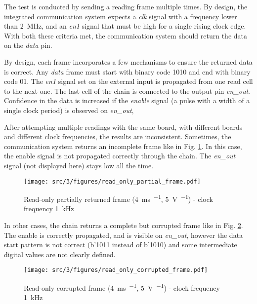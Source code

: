 The test is conducted by sending a reading frame multiple times.
By design, the integrated communication system expects a \textit{clk} signal with a frequency lower than \SI{2}{\mega\hertz}, and an \textit{en1} signal that must be high for a single rising clock edge.
With both these criteria met, the communication system should return the data on the \textit{data} pin.

By design, each frame incorporates a few mechanisms to ensure the returned data is correct.
Any \textit{data} frame must start with binary code 1010 and end with binary code 01.
The \textit{en1} signal set on the external input is propagated from one read cell to the next one.
The last cell of the chain is connected to the output pin \textit{en\_out}.
Confidence in the data is increased if the \textit{enable} signal (a pulse with a width of a single clock period) is observed on \textit{en\_out},

After attempting multiple readings with the same board, with different boards and different clock frequencies, the results are inconsistent.
Sometimes, the communication system returns an incomplete frame like in Fig. \ref{fig:read-only-partial-frame}.
In this case, the enable signal is not propagated correctly through the chain.
The \textit{en\_out} signal (not displayed here) stays low all the time.

\begin{figure}[!h]
  \centering
  \texttt{[image: src/3/figures/read\_only\_partial\_frame.pdf]}
  \caption{Read-only partially returned frame (\SI[per-mode=symbol]{4}{\milli\second\per\div}, \SI[per-mode=symbol]{5}{\volt\per\div}) - clock frequency \SI{1}{\kilo\hertz}}
  \label{fig:read-only-partial-frame}
\end{figure}

In other cases, the chain returns a complete but corrupted frame like in Fig. \ref{fig:read-only-full-frame}.
The enable is correctly propagated, and is visible on \textit{en\_out}, however the data start pattern is not correct (b'1011 instead of b'1010) and some intermediate digital values are not clearly defined.

\begin{figure}[!h]
  \centering
  \texttt{[image: src/3/figures/read\_only\_corrupted\_frame.pdf]}
  \caption{Read-only corrupted frame (\SI[per-mode=symbol]{4}{\milli\second\per\div}, \SI[per-mode=symbol]{5}{\volt\per\div}) - clock frequency \SI{1}{\kilo\hertz}}
  \label{fig:read-only-full-frame}
\end{figure}

